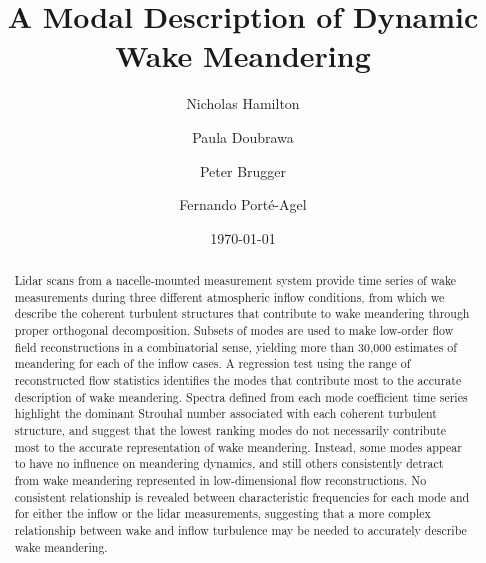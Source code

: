 \documentclass[aip,amsmath,amssymb,preprint,]{revtex4-1}
\begin{document}

\title{A Modal Description of Dynamic Wake Meandering}%

\author{Nicholas Hamilton}
\author{Paula Doubrawa}
\author{Peter Brugger}
\author{Fernando Port\'e-Agel}

\date{\today}%

\begin{abstract}
Lidar scans from a nacelle-mounted measurement system provide time series of wake measurements during three different atmospheric inflow conditions, from which we describe the coherent turbulent structures that contribute to wake meandering through proper orthogonal decomposition. 
Subsets of modes are used to make low-order flow field reconstructions in a combinatorial sense, yielding more than 30,000 estimates of meandering for each of the inflow cases.
A regression test using the range of reconstructed flow statistics identifies the modes that contribute most to the accurate description of wake meandering.
Spectra defined from each mode coefficient time series highlight the dominant Strouhal number associated with each coherent turbulent structure, and suggest that the lowest ranking modes do not necessarily contribute most to the accurate representation of wake meandering. 
Instead, some modes appear to have no influence on meandering dynamics, and still others consistently detract from wake meandering represented in low-dimensional flow reconstructions.
No consistent relationship is revealed between characteristic frequencies for each mode and for either the inflow or the lidar measurements, suggesting that a more complex relationship between wake and inflow turbulence may be needed to accurately describe wake meandering.


\end{abstract}
\end{document}
